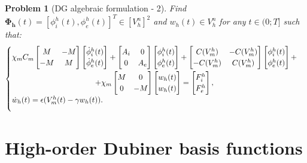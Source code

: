 \documentclass[a4paper,11pt]{article}
\newtheorem{problem}{Problem}
\begin{document}
 \begin{problem}[DG algebraic formulation - 2] \label{block_matrix}
 Find $\bm{\Phi_h}(t)=[\phi_i^h(t),\phi_e^h(t)]^T \in [V_h^n]^2$ and $w_h(t) \in V_h^n$ for any $t \in (0;T]$ such that:
 \begin{equation*}
 \begin{cases}
 \begin{gathered}
 \chi_mC_m \begin{bmatrix}M &-M \\ -M & M \end{bmatrix}
	\begin{bmatrix}\dot{\phi}_i^h(t) \\ \dot{\phi}_e^h(t) \end{bmatrix}
	 + \begin{bmatrix}A_i & 0 \\ 0 & A_e \end{bmatrix}
	 \begin{bmatrix}\phi_i^h(t) \\ \phi_e^h(t) \end{bmatrix} +
	   \begin{bmatrix}C(V_m^h) & -C(V_m^h) \\ -C(V_m^h) & C(V_m^h) \end{bmatrix} 
	   \begin{bmatrix} \phi_i^h(t) \\ \phi_e^h(t)  \end{bmatrix}+\\
	   +\chi_m \begin{bmatrix}M & 0 \\ 0 & -M \end{bmatrix} 
	   	\begin{bmatrix}w_h(t) \\ w_h(t) \end{bmatrix} = 
	   	\begin{bmatrix} F_i^h \\ F_e^h\end{bmatrix},
	   	\end{gathered}\\
	   	\vspace{3mm} 
	   \dot{w}_h(t)=\epsilon (V_m^h(t)-\gamma w_h(t)).
\end{cases}
\end{equation*}
\end{problem}
\newpage
\section{High-order Dubiner basis functions}
\end{document}
